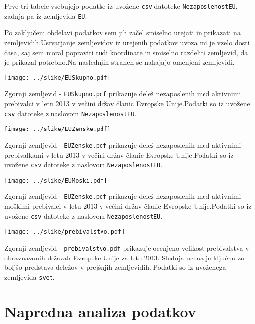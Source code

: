 \documentclass[11pt,a4paper]{article}
\begin{document}
Prve tri tabele vsebujejo podatke iz uvožene \verb|csv| datoteke \verb|NezaposlenostEU|, zadnja pa iz zemljevida \verb|EU|. 

Po zaključeni obdelavi podatkov sem jih začel smiselno urejati in prikazati na zemljevidih.Ustvarjanje zemljevidov iz urejenih podatkov uvoza mi je vzelo dosti časa, saj sem moral popraviti tudi koordinate in smiselno razdeliti zemljevid, da je prikazal potrebno.Na naslednjih straneh se nahajajo omenjeni zemljevidi. 

\texttt{[image: ../slike/EUSkupno.pdf]}

Zgornji zemljevid - \verb|EUSkupno.pdf| prikazuje delež nezaposlenih med aktivnimi prebivalci v letu 2013 v večini držav članic Evropske Unije.Podatki so iz uvožene \verb|csv| datoteke z naslovom \verb|NezaposlenostEU|. 

\texttt{[image: ../slike/EUZenske.pdf]}

Zgornji zemljevid - \verb|EUZenske.pdf| prikazuje delež nezaposlenih med aktivnimi prebivalkami v letu 2013 v večini držav članic Evropske Unije.Podatki so iz uvožene \verb|csv| datoteke z naslovom \verb|NezaposlenostEU|. 

\texttt{[image: ../slike/EUMoski.pdf]}

Zgornji zemljevid - \verb|EUZenske.pdf| prikazuje delež nezaposlenih med aktivnimi moškimi prebivalci v letu 2013 v večini držav članic Evropske Unije.Podatki so iz uvožene \verb|csv| datoteke z naslovom \verb|NezaposlenostEU|. 

\texttt{[image: ../slike/prebivalstvo.pdf]}

Zgornji zemljevid - \verb|prebivalstvo.pdf| prikazuje ocenjeno velikost prebivalstva v obravnavanih državah Evropske Unije za leto 2013. Slednja ocena je ključna za boljšo predstavo deležov v prejšnjih zemljevidih. Podatki so iz uvoženega zemljevida \verb|svet|. 

\pagebreak
\section{Napredna analiza podatkov}
\end{document}
